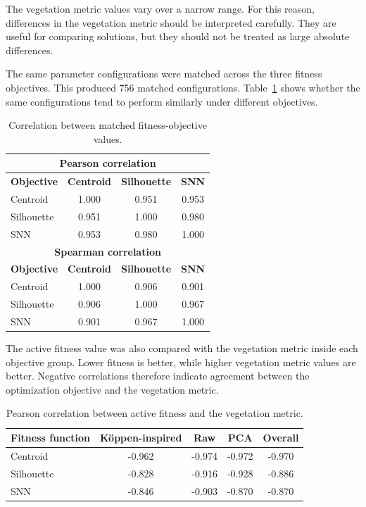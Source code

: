 \documentclass[11pt]{article}
\begin{document}
The vegetation metric values vary over a narrow range. For this reason, differences in the vegetation metric should be interpreted carefully. They are useful for comparing solutions, but they should not be treated as large absolute differences.

The same parameter configurations were matched across the three fitness objectives. This produced 756 matched configurations. Table~\ref{tab:stage1_fitness_objective_correlation} shows whether the same configurations tend to perform similarly under different objectives.

\begin{table}[ht]
\centering
\caption{Correlation between matched fitness-objective values.}
\label{tab:stage1_fitness_objective_correlation}
\begin{tabular}{lccc}
\hline
\multicolumn{4}{c}{\textbf{Pearson correlation}} \\
\hline
\textbf{Objective} & \textbf{Centroid} & \textbf{Silhouette} & \textbf{SNN} \\
\hline
Centroid & 1.000 & 0.951 & 0.953 \\
Silhouette & 0.951 & 1.000 & 0.980 \\
SNN & 0.953 & 0.980 & 1.000 \\
\hline
\multicolumn{4}{c}{\textbf{Spearman correlation}} \\
\hline
\textbf{Objective} & \textbf{Centroid} & \textbf{Silhouette} & \textbf{SNN} \\
\hline
Centroid & 1.000 & 0.906 & 0.901 \\
Silhouette & 0.906 & 1.000 & 0.967 \\
SNN & 0.901 & 0.967 & 1.000 \\
\hline
\end{tabular}
\end{table}

The active fitness value was also compared with the vegetation metric inside each objective group. Lower fitness is better, while higher vegetation metric values are better. Negative correlations therefore indicate agreement between the optimization objective and the vegetation metric.

\begin{table}[ht]
\centering
\caption{Pearson correlation between active fitness and the vegetation metric.}
\label{tab:stage1_fitness_ecology_pearson}
\begin{tabular}{lcccc}
\hline
\textbf{Fitness function} & \textbf{Köppen-inspired} & \textbf{Raw} & \textbf{PCA} & \textbf{Overall} \\
\hline
Centroid & -0.962 & -0.974 & -0.972 & -0.970 \\
Silhouette & -0.828 & -0.916 & -0.928 & -0.886 \\
SNN & -0.846 & -0.903 & -0.870 & -0.870 \\
\hline
\end{tabular}
\end{table}
\end{document}
